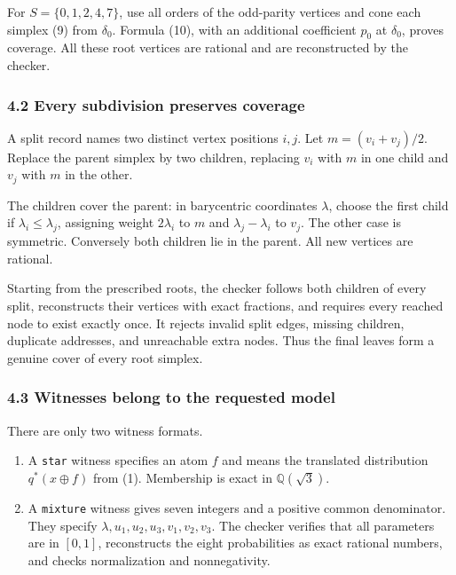 For \(S=\{0,1,2,4,7\}\), use all orders of the odd-parity vertices and
cone each simplex (9) from \(\delta_0\). Formula (10), with an
additional coefficient \(p_0\) at \(\delta_0\), proves coverage. All
these root vertices are rational and are reconstructed by the checker.

\subsubsection{4.2 Every subdivision preserves
coverage}\label{every-subdivision-preserves-coverage}

A split record names two distinct vertex positions \(i,j\). Let
\(m=(v_i+v_j)/2\). Replace the parent simplex by two children, replacing
\(v_i\) with \(m\) in one child and \(v_j\) with \(m\) in the other.

The children cover the parent: in barycentric coordinates \(\lambda\),
choose the first child if \(\lambda_i\le\lambda_j\), assigning weight
\(2\lambda_i\) to \(m\) and \(\lambda_j-\lambda_i\) to \(v_j\). The
other case is symmetric. Conversely both children lie in the parent. All
new vertices are rational.

Starting from the prescribed roots, the checker follows both children of
every split, reconstructs their vertices with exact fractions, and
requires every reached node to exist exactly once. It rejects invalid
split edges, missing children, duplicate addresses, and unreachable
extra nodes. Thus the final leaves form a genuine cover of every root
simplex.

\subsubsection{4.3 Witnesses belong to the requested
model}\label{witnesses-belong-to-the-requested-model}

There are only two witness formats.

\begin{enumerate}
\def\labelenumi{\arabic{enumi}.}
\tightlist
\item
  A \texttt{star} witness specifies an atom \(f\) and means the
  translated distribution \(q^*(x\mathbin\oplus f)\) from (1).
  Membership is exact in \(\mathbb Q(\sqrt3)\).
\item
  A \texttt{mixture} witness gives seven integers and a positive common
  denominator. They specify \(\lambda,u_1,u_2,u_3,v_1,v_2,v_3\). The
  checker verifies that all parameters are in \([0,1]\), reconstructs
  the eight probabilities as exact rational numbers, and checks
  normalization and nonnegativity.
\end{enumerate}

